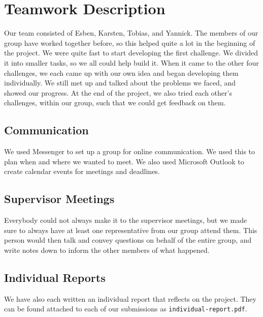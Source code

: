 \section{Teamwork Description}\label{sec:team-work-description}



Our team consisted of Esben, Karsten, Tobias, and Yannick. The members of our group have worked together before, so this helped quite a lot in the beginning of the project. We were quite fast to start developing the first challenge. We divided it into smaller tasks, so we all could help build it. When it came to the other four challenges, we each came up with our own idea and began developing them individually. We still met up and talked about the problems we faced, and showed our progress. At the end of the project, we also tried each other's challenges, within our group, such that we could get feedback on them.

\subsection{Communication}

We used Messenger to set up a group for online communication. We used this to plan when and where we wanted to meet. We also used Microsoft Outlook to create calendar events for meetings and deadlines.

\subsection{Supervisor Meetings}

Everybody could not always make it to the supervisor meetings, but we made sure to always have at least one representative from our group attend them. This person would then talk and convey questions on behalf of the entire group, and write notes down to inform the other members of what happened.

\subsection{Individual Reports}

We have also each written an individual report that reflects on the project. They can be found attached to each of our submissions as \texttt{individual-report.pdf}.